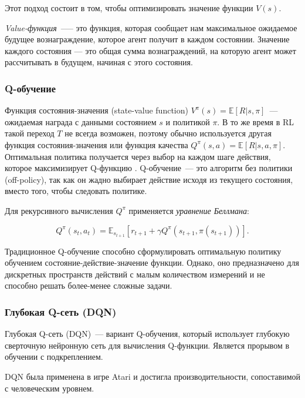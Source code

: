 Этот подход состоит в том, чтобы оптимизировать значение функции $V(s)$.

\textit{Value-функция}~--— это функция, которая сообщает нам максимальное ожидаемое будущее вознаграждение, которое агент получит в каждом состоянии. Значение каждого состояния — это общая сумма вознаграждений, на которую агент может рассчитывать в будущем, начиная с этого состояния.

\subsubsection{Q-обучение}

Функция состояния-значения (state-value function) $V^\pi (s) = \mathbb{E}[R|s, \pi]$~--- ожидаемая награда с данными состоянием $s$ и политикой $\pi$. В то же время в RL такой переход $T$ не всегда возможен, поэтому обычно используется другая функция состояния-значения или функция качества ${Q^\pi(s,a) = \mathbb{E}[R|s, a, \pi]}$. Оптимальная политика получается через выбор на каждом шаге действия, которое максимизирует Q-функцию \cite{SuttonAndBarto-RL-Introduction-p107}. Q-обучение~--- это алгоритм без политики (off-policy), так как он жадно выбирает действие исходя из текущего состояния, вместо того, чтобы следовать политике.

Для рекурсивного вычисления $Q^\pi$ применяется {\itshape уравнение Беллмана}:

\begin{equation}
    \label{eq:q-learning-bellmanEq}
    Q^\pi(s_t, a_t) = \mathbb{E}_{s_{t+1}}[r_{t+1} + \gamma Q^\pi (s_{t+1}, \pi(s_{t+1}))].
\end{equation}

Традиционное Q-обучение способно сформулировать оптимальную политику обучением состояние-действие-значение функции. Однако, оно предназначено для дискретных пространств действий с малым количеством измерений и не способно решать более-менее сложные задачи.

\subsubsection{Глубокая Q-сеть (DQN)}

Глубокая Q-сеть (DQN)~--- вариант Q-обучения, который использует глубокую сверточную нейронную сеть для вычисления Q-функции. Является прорывом в обучении с подкреплением. \cite{bertsekas1996neuro}

DQN была применена в игре Atari и достигла производительности, сопоставимой с человеческим уровнем. \cite{Mnih2015}

